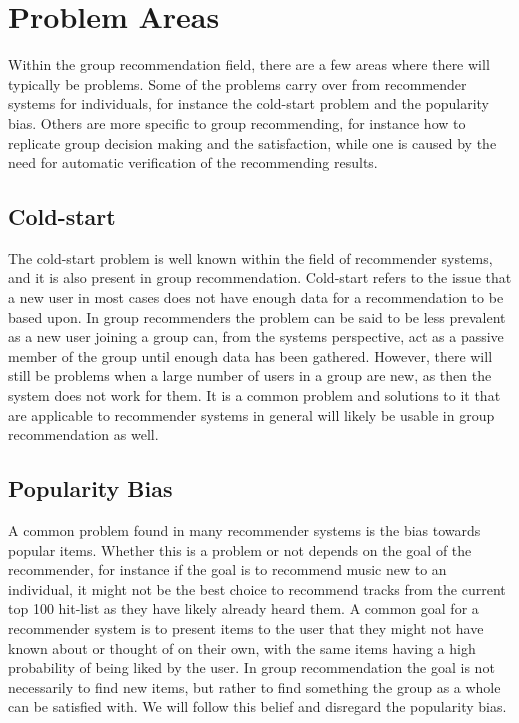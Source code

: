 \section{Problem Areas} \label{sec:problemareas}

Within the group recommendation field, there are a few areas where there will typically be problems. Some of the problems carry over from recommender systems for individuals, for instance the cold-start problem and the popularity bias. Others are more specific to group recommending, for instance how to replicate group decision making and the satisfaction, while one is caused by the need for automatic verification of the recommending results.

\subsection{Cold-start}
The cold-start problem is well known within the field of recommender systems, and it is also present in group recommendation\cite{recsyshandbookagreggation}. Cold-start refers to the issue that a new user in most cases does not have enough data for a recommendation to be based upon. In group recommenders the problem can be said to be less prevalent as a new user joining a group can, from the systems perspective, act as a passive member of the group until enough data has been gathered. However, there will still be problems when a large number of users in a group are new, as then the system does not work for them. It is a common problem and solutions to it that are applicable to recommender systems in general will likely be usable in group recommendation as well.

\subsection{Popularity Bias}
A common problem found in many recommender systems is the bias towards popular items\cite{doi:10.1287/mnsc.1080.0974}. Whether this is a problem or not depends on the goal of the recommender, for instance if the goal is to recommend music new to an individual, it might not be the best choice to recommend tracks from the current top 100 hit-list as they have likely already heard them. A common goal for a recommender system is to present items to the user that they might not have known about or thought of on their own, with the same items having a high probability of being liked by the user. In group recommendation the goal is not necessarily to find new items, but rather to find something the group as a whole can be satisfied with. We will follow this belief and disregard the popularity bias.

